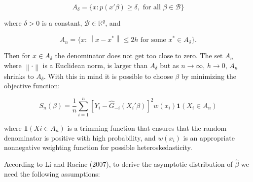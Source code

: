\documentclass[a4paper]{article}
\newcommand{\norm}[1]{\left\lVert#1\right\rVert}
\begin{document}
\[ A_\delta = \{ x : p(x'\beta) \geq \delta, \text{ for all }  \beta \in \mathcal{B} \}
\]

where $\delta > 0$ is a constant, $\mathcal{B} \in \mathbb{R}^q$, and

\[ A_n = \{ x : \norm{x - x^*} \leq 2h \text{ for some } x^* \in A_\delta\}.
\]

Then for $x \in A_\delta$ the denominator does not get too close to zero. The set $A_n$ where $\norm{\cdot}$ is a Euclidean norm, is larger than $A_\delta$ but as $ n \rightarrow \infty $, $h \rightarrow 0$, $A_n$ shrinks to $A_\delta$. With this in mind it is possible to choose $\beta$ by minimizing the objective function:

\begin{equation}
S_n(\beta) = \frac{1}{n} \sum_{i=1}^{n}  [Y_i - \hat{G}_{-i}(X_i'\beta)]^2w(x_i)\mathbf{1}{(X_i \in A_n)}
\end{equation}

where $\mathbf{1}{(Xi \in A_n)}$ is a trimming function that ensures that the random denominator is positive with high probability, and $w(x_i)$ is an appropriate nonnegative weighting function for possible heteroskedasticity. 

According to Li and Racine (2007), to derive the asymptotic distribution of $\hat{\beta}$ we need the following assumptions:

\newtheorem{theorem}{Theorem}[section]
\end{document}
